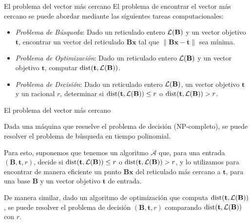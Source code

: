 \begin{frame}{El problema del vector más cercano}
El problema de encontrar el vector más cercano se puede abordar mediante las siguientes tareas computacionales:

\begin{itemize}
    \item \textit{Problema de Búsqueda}: Dado un reticulado entero $\mathcal{L}(\mathbf{B})$ y un vector objetivo $\mathbf{t}$, encontrar un vector del reticulado $\mathbf{Bx}$ tal que $\|\mathbf{Bx} - \mathbf{t}\|$ sea mínima.
    \item \textit{Problema de Optimización}: Dado un reticulado entero $\mathcal{L}(\mathbf{B})$ y un vector objetivo $\mathbf{t}$, computar $\text{dist}(\mathbf{t}, \mathcal{L}(\mathbf{B}))$.
    \item \textit{Problema de Decisión}: Dado un reticulado entero $\mathcal{L}(\mathbf{B})$, un vector objetivo $\mathbf{t}$ y un racional $r$, determinar si $\text{dist}(\mathbf{t}, \mathcal{L}(\mathbf{B})) \leq r$ o $\text{dist}(\mathbf{t}, \mathcal{L}(\mathbf{B})) > r$.
\end{itemize}
\end{frame}

\begin{frame}{El problema del vector más cercano}
\begin{remark}
Dada una máquina que resuelve el problema de decisión (NP-completo), se puede resolver el problema de búsqueda en tiempo polinomial.
\end{remark}

Para esto, suponemos que tenemos un algoritmo $\mathcal{A}$ que, para una entrada $(\mathbf{B},\mathbf{t},r)$, decide si $\text{dist}(\mathbf{t}, \mathcal{L}(\mathbf{B})) \leq r$ o $\text{dist}(\mathbf{t}, \mathcal{L}(\mathbf{B})) > r$, y lo utilizamos para encontrar de manera eficiente un punto $\mathbf{Bx}$ del reticulado más cercano a $\mathbf{t}$, para una base $\mathbf{B}$ y un vector objetivo $\mathbf{t}$ de entrada.

De manera similar, dado un algoritmo de optimización que computa $\text{dist}(\mathbf{t},\mathcal{L}(\mathbf{B}))$, se puede resolver el problema de decisión $(\mathbf{B}, \mathbf{t}, r)$ comparando $\text{dist}(\mathbf{t},\mathcal{L}(\mathbf{B}))$ con $r$.
\end{frame}

